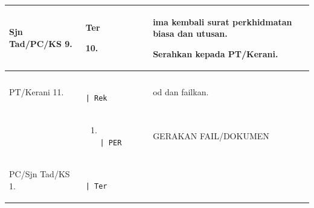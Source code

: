 \documentclass[
]{article}
\begin{document}
\begin{longtable}[]{@{}lll@{}}
\toprule
\begin{minipage}[b]{0.30\columnwidth}\raggedright
Sjn Tad/PC/KS \textbar{} 9.\strut
\end{minipage} & \begin{minipage}[b]{0.30\columnwidth}\raggedright
Ter

10.\strut
\end{minipage} & \begin{minipage}[b]{0.30\columnwidth}\raggedright
ima kembali surat perkhidmatan biasa dan utusan.

Serahkan kepada PT/Kerani.\strut
\end{minipage}\tabularnewline
\midrule
\endhead
\begin{minipage}[t]{0.30\columnwidth}\raggedright
PT/Kerani \textbar{} 11.\strut
\end{minipage} & \begin{minipage}[t]{0.30\columnwidth}\raggedright
\begin{verbatim}
              | Rek
\end{verbatim}
\strut
\end{minipage} & \begin{minipage}[t]{0.30\columnwidth}\raggedright
od dan failkan.\strut
\end{minipage}\tabularnewline
\begin{minipage}[t]{0.30\columnwidth}\raggedright
\strut
\end{minipage} & \begin{minipage}[t]{0.30\columnwidth}\raggedright
\begin{enumerate}
\def\labelenumi{\Alph{enumi}.}
\setcounter{enumi}{1}
\item
\begin{verbatim}
           | PER
\end{verbatim}
\end{enumerate}\strut
\end{minipage} & \begin{minipage}[t]{0.30\columnwidth}\raggedright
GERAKAN FAIL/DOKUMEN\strut
\end{minipage}\tabularnewline
\begin{minipage}[t]{0.30\columnwidth}\raggedright
PC/Sjn Tad/KS \textbar{} 1.\strut
\end{minipage} & \begin{minipage}[t]{0.30\columnwidth}\raggedright
\begin{verbatim}
              | Ter
\end{verbatim}


\end{minipage}
\end{longtable}
\end{document}
